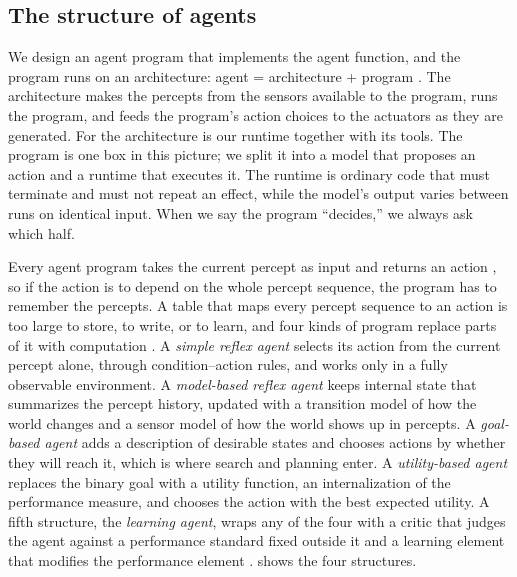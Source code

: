 
\subsection{The structure of agents}
\label{sec:agents-structure}

We design an agent program that implements the agent function, and the program runs on an
architecture: agent = architecture + program \citep[\S2.4]{russell2020aima}. The architecture
makes the percepts from the sensors available to the program, runs the program, and feeds the
program's action choices to the actuators as they are generated. For \msa{} the architecture is
our runtime together with its tools. The program is one box in this picture; we split it into a
model that proposes an action and a runtime that executes it. The runtime is ordinary code that
must terminate and must not repeat an effect, while the model's output varies between runs on
identical input. When we say the program ``decides,'' we always ask which half.

Every agent program takes the current percept as input and returns an action
\citep[\S2.4.1]{russell2020aima}, so if the action is to depend on the whole percept sequence,
the program has to remember the percepts. A table that maps every percept sequence to an action
is too large to store, to write, or to learn, and four kinds of program replace parts of it with
computation \citep[\S\S2.4.2--2.4.5]{russell2020aima}. A \emph{simple reflex agent} selects its
action from the current percept alone, through condition--action rules, and works only in a
fully observable environment. A \emph{model-based reflex agent} keeps internal state that
summarizes the percept history, updated with a transition model of how the world changes and a
sensor model of how the world shows up in percepts. A \emph{goal-based agent} adds a description
of desirable states and chooses actions by whether they will reach it, which is where search and
planning enter. A \emph{utility-based agent} replaces the binary goal with a utility function,
an internalization of the performance measure, and chooses the action with the best expected
utility. A fifth structure, the \emph{learning agent}, wraps any of the four with a critic that
judges the agent against a performance standard fixed outside it and a learning element that
modifies the performance element \citep[\S2.4.6]{russell2020aima}. 
shows the four structures.

